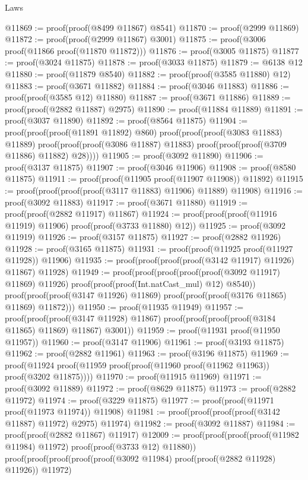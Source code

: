 \begin{lexlean}{Laws}
\begin{coremodule}
@11869 := proof(proof(@8499 @11867) @8541)
@11870 := proof(@2999 @11869)
@11872 := proof(proof(@2999 @11867) @3001)
@11875 := proof(@3006 proof(@11866 proof(@11870 @11872)))
@11876 := proof(@3005 @11875)
@11877 := proof(@3024 @11875)
@11878 := proof(@3033 @11875)
@11879 := @6138 @12
@11880 := proof(@11879 @8540)
@11882 := proof(proof(@3585 @11880) @12)
@11883 := proof(@3671 @11882)
@11884 := proof(@3046 @11883)
@11886 := proof(proof(@3585 @12) @11880)
@11887 := proof(@3671 @11886)
@11889 := proof(proof(@2882 @11887) @2975)
@11890 := proof(@11884 @11889)
@11891 := proof(@3037 @11890)
@11892 := proof(@8564 @11875)
@11904 := proof(proof(proof(@11891 @11892) @860)
      proof(proof(proof(@3083 @11883) @11889)
          proof(proof(proof(@3086 @11887) @11883) proof(proof(proof(@3709 @11886) @11882) @28))))
@11905 := proof(@3092 @11890)
@11906 := proof(@3137 @11875)
@11907 := proof(@3046 @11906)
@11908 := proof(@8580 @11875)
@11911 := proof(proof(@11905 proof(@11907 @11908)) @11892)
@11915 := proof(proof(proof(proof(@3117 @11883) @11906) @11889) @11908)
@11916 := proof(@3092 @11883)
@11917 := proof(@3671 @11880)
@11919 := proof(proof(@2882 @11917) @11867)
@11924 := proof(proof(proof(@11916 @11919) @11906) proof(proof(@3733 @11880) @12))
@11925 := proof(@3092 @11919)
@11926 := proof(@3157 @11875)
@11927 := proof(@2882 @11926)
@11928 := proof(@3165 @11875)
@11931 := proof(proof(@11925 proof(@11927 @11928)) @11906)
@11935 := proof(proof(proof(proof(@3142 @11917) @11926) @11867) @11928)
@11949 := proof(proof(proof(proof(proof(@3092 @11917) @11869) @11926)
        proof(proof(proof(Int.natCast_mul) @12) @8540))
      proof(proof(proof(@3147 @11926) @11869) proof(proof(proof(@3176 @11865) @11869) @11872)))
@11950 := proof(@11935 @11949)
@11957 := proof(proof(proof(@3147 @11928) @11867)
      proof(proof(proof(proof(@3184 @11865) @11869) @11867) @3001))
@11959 := proof(@11931 proof(@11950 @11957))
@11960 := proof(@3147 @11906)
@11961 := proof(@3193 @11875)
@11962 := proof(@2882 @11961)
@11963 := proof(@3196 @11875)
@11969 := proof(@11924 proof(@11959 proof(proof(@11960 proof(@11962 @11963)) proof(@3202 @11875))))
@11970 := proof(@11915 @11969)
@11971 := proof(@3092 @11889)
@11972 := proof(@8629 @11875)
@11973 := proof(@2882 @11972)
@11974 := proof(@3229 @11875)
@11977 := proof(proof(@11971 proof(@11973 @11974)) @11908)
@11981 := proof(proof(proof(proof(@3142 @11887) @11972) @2975) @11974)
@11982 := proof(@3092 @11887)
@11984 := proof(proof(@2882 @11867) @11917)
@12009 := proof(proof(proof(proof(@11982 @11984) @11972) proof(proof(@3733 @12) @11880))
      proof(proof(proof(proof(proof(@3092 @11984) proof(proof(@2882 @11928) @11926)) @11972)

\end{coremodule}
\end{lexlean}
